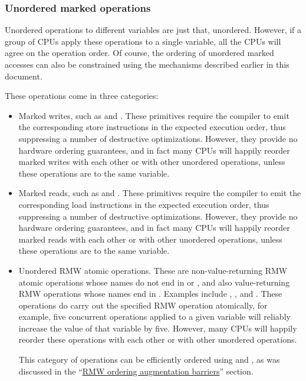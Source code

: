 \subsubsection{Unordered marked operations}

Unordered operations to different variables are just that, unordered.
However, if a group of CPUs apply these operations to a single variable,
all the CPUs will agree on the operation order.
Of course, the ordering of unordered marked accesses can also be
constrained using the mechanisms described earlier in this document.

These operations come in three categories:

\begin{itemize}
 \item	Marked writes, such as  and .
	These primitives require the compiler to emit the corresponding store
	instructions in the expected execution order, thus suppressing
	a number of destructive optimizations.
	However, they provide no hardware ordering guarantees, and in
	fact many CPUs will happily reorder marked writes with each other
	or with other unordered operations, unless these operations are
	to the same variable.

 \item	Marked reads, such as  and .
	These primitives require the compiler to emit the corresponding load
	instructions in the expected execution order, thus suppressing
	a number of destructive optimizations.
	However, they provide no hardware ordering guarantees, and in
	fact many CPUs will happily reorder marked reads with each other
	or with other unordered operations, unless these operations are
	to the same variable.

 \item	Unordered RMW atomic operations.
	These are non-value-returning RMW atomic operations whose names
	do not end in  or , and also
	value-returning RMW operations whose names end in .
	Examples include , ,
	and .
	These operations do carry out the specified RMW operation atomically,
	for example, five concurrent  operations applied
	to a given variable will reliably increase the value of that
	variable by five.
	However, many CPUs will happily reorder these operations with
	each other or with other unordered operations.

	This category of operations can be efficiently ordered using
	 and , as was
	discussed in the
	``\hyperref[sec:docs:ordering:RMW ordering augmentation barriers]
	  {RMW ordering augmentation barriers}''
	section.
\end{itemize}

